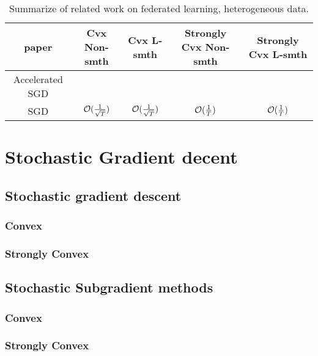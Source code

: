 

\begin{table}[h!]
\centering
\small
	\begin{tabular}{|c|c|c|c|c|}\hline
		paper         &  Cvx Non-smth & Cvx L-smth & Strongly Cvx Non-smth& Strongly Cvx L-smth \\ \hline
	Accelerated	SGD   &        &    &       &      \\\hline
	SGD    &    ${\mathcal{O}}(\frac{1}{\sqrt{T}})$  &   ${\mathcal{O}}(\frac{1}{\sqrt{T}})$  &  ${\mathcal{O}}(\frac{1}{T})$  & ${\mathcal{O}}(\frac{1}{T})$\cite{li2019convergence,haddadpour2019convergence}      \\\hline
	\end{tabular}
	\caption{Summarize of related work on federated learning, heterogeneous data.}
\end{table}


\section{Stochastic Gradient decent}

\subsection{Stochastic gradient descent}
\subsubsection{Convex}


\subsubsection{Strongly Convex}
\cite{li2019convergence}

\subsection{Stochastic Subgradient methods}

\subsubsection{Convex}

\subsubsection{Strongly Convex}




